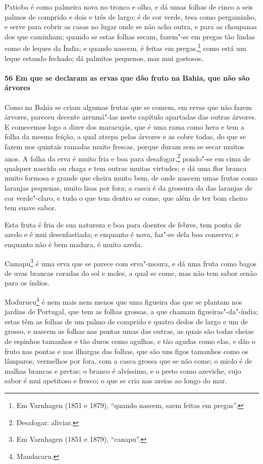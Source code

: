 Patioba é como palmeira nova no tronco e olho, e dá umas folhas de cinco a seis palmos de
comprido e dois e três de largo; é de cor verde, tesa como pergaminho, e serve para cobrir
as casas no lugar onde se não acha outra, e para as choupanas dos que caminham; quando se
estas folhas secam, fazem"-se em pregas tão lindas como de leques da Índia; e quando
nascem, é feitas em pregas,\footnote{ Em Varnhagen (1851 e 1879), ``quando nascem, saem
feitas em pregas''.} como está um leque estando fechado; dá palmitos pequenos, mas mui
gostosos.

\paragraph{56 Em que se declaram as ervas que dão fruto na Bahia, que não são árvores}

Como na Bahia se criam algumas frutas que se comem, em ervas que não fazem árvores,
pareceu decente arrumá"-las neste capítulo apartadas das outras árvores. E comecemos logo a
dizer dos maracujás, que é uma rama como hera e tem a folha da mesma feição, a qual atrepa
pelas árvores e as cobre todas, do que se fazem nos quintais ramadas muito frescas, porque
duram sem se secar muitos anos. A folha da erva é muito fria e boa para
desafogar,\footnote{ Desafogar: aliviar.} pondo"-se em cima de qualquer nascida ou chaga e
tem outras muitas virtudes; e dá uma flor branca muito formosa e grande que cheira muito
bem, de onde nascem umas frutas como laranjas pequenas, muito lisas por fora; a casca é da
grossura da das laranjas de cor verde"-claro, e tudo o que tem dentro se come, que além de
ter bom cheiro tem suave sabor.

Esta fruta é fria de sua natureza e boa para doentes de febres, tem ponta de azedo e é mui
desenfastiada; e enquanto é nova, faz"-se dela boa conserva; e enquanto não é bem madura, é
muito azeda.

Camapu\footnote{ Em Varnhagen (1851 e 1879), ``canapu''.} é uma erva que se parece com
erva"-moura, e dá uma fruta como bagos de uvas brancas coradas do sol e moles, a qual se
come, mas não tem sabor senão para os índios.

Modurucu\footnote{ Mandacaru.} é nem mais nem menos que uma figueira das que se plantam
nos jardins de Portugal, que tem as folhas grossas, a que chamam figueiras"-da"-índia; estas
têm as folhas de um palmo de comprido e quatro dedos de largo e um de grosso, e nascem as
folhas nas pontas umas das outras, as quais são todas cheias de espinhos tamanhos e tão
duros como agulhas, e tão agudas como elas, e dão o fruto nas pontas e nas ilhargas das
folhas, que são uns figos tamanhos como os lâmparos, vermelhos por fora, com a casca
grossa que se não come; o miolo é de malhas brancas e pretas; o branco é alvíssimo, e o
preto como azeviche, cujo sabor é mui apetitoso e fresco; o que se cria nas areias ao
longo do mar.

